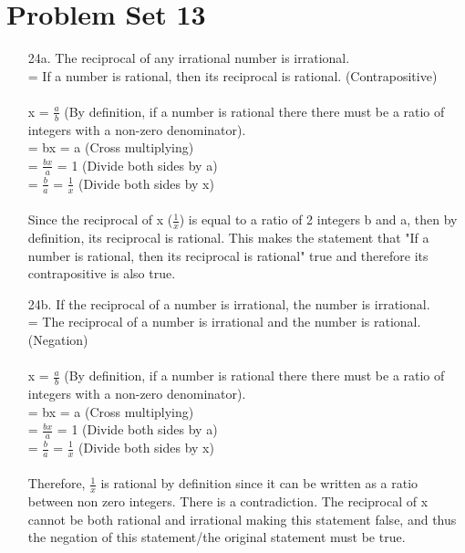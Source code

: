 \documentclass[12pt]{article}
\begin{document}
\section*{Problem Set 13}
\begin{itemize}
    \item [24a.]
        The reciprocal of any irrational number is irrational. \\
        = If a number is rational, then its reciprocal is rational. (Contrapositive) \\
        \\
        x = $\frac{a}{b}$ (By definition, if a number is rational there there must be
                            a ratio of integers with a non-zero denominator). \\
        = bx = a (Cross multiplying) \\
        = $\frac{bx}{a}$ = 1 (Divide both sides by a) \\
        = $\frac{b}{a}$ = $\frac{1}{x}$ (Divide both sides by x) \\
        \\
        Since the reciprocal of x ($\frac{1}{x}$) is equal to a ratio of 2 integers b
        and a, then by definition, its reciprocal is rational. This makes the statement
        that "If a number is rational, then its reciprocal is rational" true and therefore
        its contrapositive is also true.
    \item [24b.]
        If the reciprocal of a number is irrational, the number is irrational. \\
        = The reciprocal of a number is irrational and the number is rational. (Negation) \\
        \\
        x = $\frac{a}{b}$ (By definition, if a number is rational there there must be
        a ratio of integers with a non-zero denominator). \\
        = bx = a (Cross multiplying) \\
        = $\frac{bx}{a}$ = 1 (Divide both sides by a) \\
        = $\frac{b}{a}$ = $\frac{1}{x}$ (Divide both sides by x) \\
        \\
        Therefore, $\frac{1}{x}$ is rational by definition since it can be written as
        a ratio between non zero integers. There is a contradiction. The reciprocal of
        x cannot be both rational and irrational making this statement false, and thus
        the negation of this statement/the original statement must be true.
\end{itemize}
\end{document}
